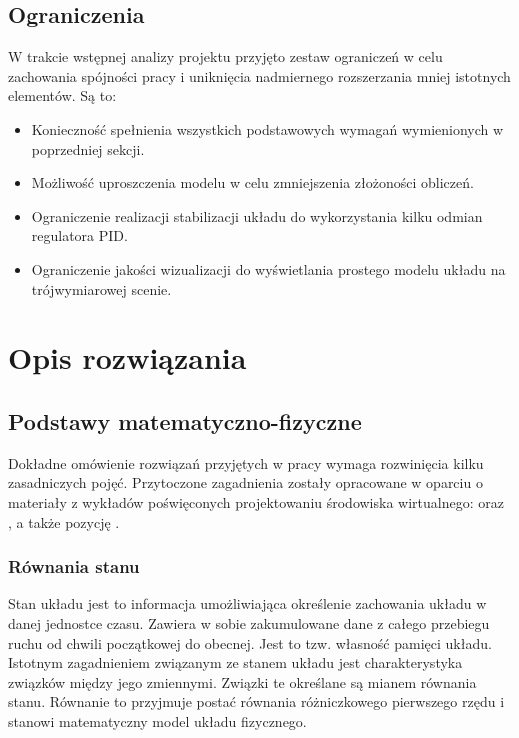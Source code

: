 \documentclass[12pt, twoside, openany]{report}
\theoremstyle{definition}
\begin{document}
\section{Ograniczenia}
W trakcie wstępnej analizy projektu przyjęto zestaw ograniczeń w celu zachowania spójności pracy i uniknięcia nadmiernego rozszerzania mniej istotnych elementów. Są to:
\begin{itemize}
\item Konieczność spełnienia wszystkich podstawowych wymagań wymienionych w poprzedniej sekcji.
\item Możliwość uproszczenia modelu w celu zmniejszenia złożoności obliczeń.
\item Ograniczenie realizacji stabilizacji układu do wykorzystania kilku odmian regulatora PID.
\item Ograniczenie jakości wizualizacji do wyświetlania prostego modelu układu na trójwymiarowej scenie.
\end{itemize}

\newpage
\chapter{Opis rozwiązania}
\section{Podstawy matematyczno-fizyczne}
Dokładne omówienie rozwiązań przyjętych w pracy wymaga rozwinięcia kilku zasadniczych pojęć. Przytoczone zagadnienia zostały opracowane w oparciu o materiały z wykładów poświęconych projektowaniu środowiska wirtualnego: \cite{MarciniakControlSystems} oraz \cite{MarciniakClosedLoop}, a także pozycję \cite{RungeKutta}.

\subsection{Równania stanu}
\label{StateSpaceSubsection}
Stan układu jest to informacja umożliwiająca określenie zachowania układu w danej jednostce czasu. Zawiera w sobie zakumulowane dane z całego przebiegu ruchu od chwili początkowej do obecnej. Jest to tzw. własność pamięci układu. Istotnym zagadnieniem związanym ze stanem układu jest charakterystyka związków między jego zmiennymi. Związki te określane są mianem równania stanu. Równanie to przyjmuje postać równania różniczkowego pierwszego rzędu i stanowi matematyczny model układu fizycznego.
\end{document}
